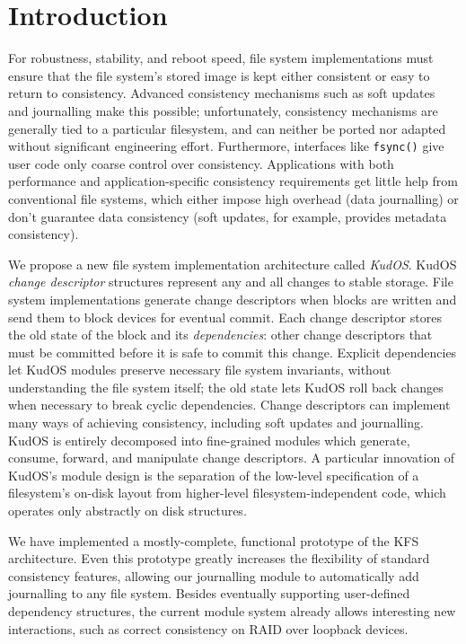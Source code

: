 
\section*{Introduction}
\label{sec:intro}

For robustness, stability, and reboot speed, file system implementations
must ensure that the file system's stored image is kept either consistent
or easy to return to consistency.
%
Advanced consistency mechanisms such as soft updates~\cite{ganger00soft}
and journalling make this possible; unfortunately,
%
%
consistency mechanisms are generally tied to a particular filesystem, and
can neither be ported nor adapted without significant engineering
effort.
%
Furthermore, interfaces like \verb+fsync()+ give user code only coarse control
over consistency.
%
Applications with both performance and application-specific consistency
requirements get little help from conventional file systems, which either
impose high overhead (data journalling) or don't guarantee data consistency
(soft updates, for example, provides metadata consistency).



We propose a new file system implementation architecture called
\emph{KudOS}.
%
KudOS \emph{change descriptor} structures represent any and all changes to
stable storage.
%
File system implementations generate change descriptors when blocks are
written and send them to block devices for eventual commit.
%
Each change descriptor stores the old state of the block and its
\emph{dependencies}: other change descriptors that must be committed before
it is safe to commit this change.
%
Explicit dependencies let KudOS modules preserve necessary file system
invariants, without understanding the file system itself; the old state
lets KudOS roll back changes when necessary to break cyclic dependencies.
%
Change descriptors can implement many ways of achieving
consistency, including soft updates and journalling.
%
%
%
KudOS is entirely decomposed into fine-grained modules which generate,
consume, forward, and manipulate change descriptors.
%
A particular innovation of KudOS's module design is the separation of the
low-level specification of a filesystem's on-disk layout from higher-level
filesystem-independent code, which operates only abstractly on disk
structures.

We have implemented a mostly-complete, functional prototype of the KFS
architecture.  Even this prototype greatly increases the
flexibility of standard consistency features, allowing our journalling
module to automatically add journalling to any file system. 
%
%
Besides eventually supporting user-defined dependency structures, the
current module system already allows interesting new interactions, such as
correct consistency on RAID over loopback devices.
